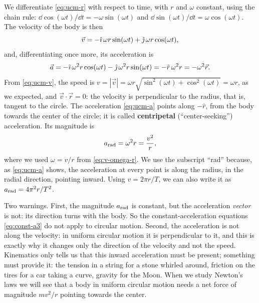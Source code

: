 \documentclass[11pt,a4paper]{article}
\begin{document}
We differentiate \eqref{eq:ucm-r} with respect to time, with $r$ and $\omega$ constant, using the
chain rule: $\dd\cos(\omega t)/\dd t = -\omega\sin(\omega t)$ and
$\dd\sin(\omega t)/\dd t = \omega\cos(\omega t)$. The velocity of the body is then
\begin{equation}\label{eq:ucm-v}
  \vec{v} = -\hat{\imath}\, \omega r\sin(\omega t) + \hat{\jmath}\, \omega r\cos(\omega t) ,
\end{equation}
and, differentiating once more, its acceleration is
\begin{equation}\label{eq:ucm-a}
  \vec{a} = -\hat{\imath}\, \omega^2 r\cos(\omega t) - \hat{\jmath}\, \omega^2 r\sin(\omega t) = -\hat{r}\,\omega^2 r
          = -\omega^2\vec{r} .
\end{equation}
From \eqref{eq:ucm-v}, the speed is $v = |\vec{v}| = \omega r\sqrt{\sin^2(\omega t) +
\cos^2(\omega t)} = \omega r$, as we expected, and $\vec{v}\cdot\vec{r} = 0$: the velocity is
perpendicular to the radius, that is, tangent to the circle. The acceleration \eqref{eq:ucm-a}
points along $-\hat{r}$, from the body towards the center of the circle; it is called
\textbf{centripetal} (``center-seeking'') acceleration. Its magnitude is
\begin{equation}\label{eq:arad}
  a_{\mathrm{rad}} = \omega^2 r = \frac{v^2}{r} ,
\end{equation}
where we used $\omega = v/r$ from \eqref{eq:v-omega-r}. We use the subscript ``rad'' because, as
\eqref{eq:ucm-a} shows, the acceleration at every point is along the radius, in the radial
direction, pointing inward. Using $v = 2\pi r/T$, we can also write it as
$a_{\mathrm{rad}} = 4\pi^2 r/T^2$.

Two warnings. First, the magnitude $a_{\mathrm{rad}}$ is constant, but the acceleration \emph{vector} is
not: its direction turns with the body. So the constant-acceleration equations \eqref{eq:const-a3}
do not apply to circular motion. Second, the acceleration is not along the velocity: in uniform
circular motion it is perpendicular to it, and this is exactly why it changes only the direction of
the velocity and not the speed. Kinematics only tells us that this inward acceleration must be
present; something must provide it: the tension in a string for a stone whirled around, friction
on the tires for a car taking a curve, gravity for the Moon. When we study Newton's laws we will
see that a body in uniform circular motion needs a net force of magnitude $mv^2/r$ pointing towards
the center.
\end{document}
